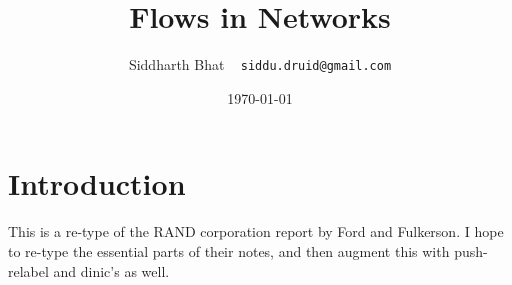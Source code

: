 \documentclass[titlepage]{article}
\title{Flows in Networks}
\author{Siddharth Bhat ~ \texttt{siddu.druid@gmail.com}}
\date{\today}
\begin{document}
\maketitle

\section{Introduction}
This is a re-type of the RAND corporation report by Ford and Fulkerson. I hope
to re-type the essential parts of their notes, and then augment this with
push-relabel and dinic's as well.



\nocite{*}
\end{document}

